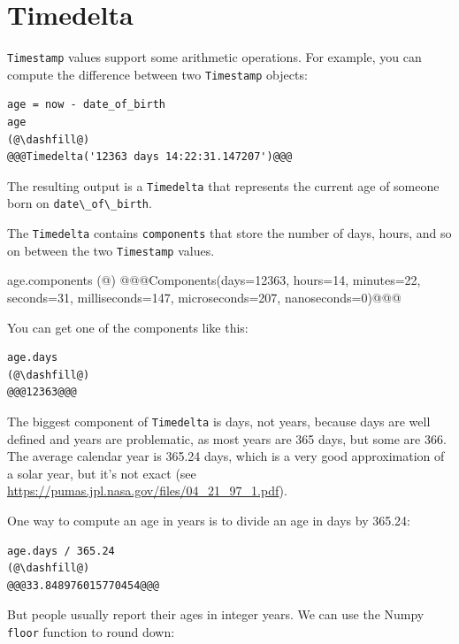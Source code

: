 \hypertarget{timedelta}{%
\section{Timedelta}\label{timedelta}}

\passthrough{\lstinline!Timestamp!} values support some arithmetic
operations. For example, you can compute the difference between two
\passthrough{\lstinline!Timestamp!} objects:

\begin{lstlisting}[]
age = now - date_of_birth
age
(@\dashfill@)
@@@Timedelta('12363 days 14:22:31.147207')@@@
\end{lstlisting}
The resulting output is a \passthrough{\lstinline!Timedelta!} that represents the
current age of someone born on
\passthrough{\lstinline!date\_of\_birth!}. 

The
\passthrough{\lstinline!Timedelta!} contains
\passthrough{\lstinline!components!} that store the number of days,
hours, and so on between the two \passthrough{\lstinline!Timestamp!} values.

\begin{codewide}[]
age.components
(@\dashfill@)
@@@Components(days=12363, hours=14, minutes=22, seconds=31, milliseconds=147, microseconds=207, nanoseconds=0)@@@
\end{codewide}

You can get one of the components like this:

\begin{lstlisting}[]
age.days
(@\dashfill@)
@@@12363@@@
\end{lstlisting}

The biggest component of \passthrough{\lstinline!Timedelta!} is days,
not years, because days are well defined and years are problematic, as most years are 365 days, but some are 366. The average calendar year is
365.24 days, which is a very good approximation of a solar year, but it's not exact (see
\url{https://pumas.jpl.nasa.gov/files/04_21_97_1.pdf}).

One way to compute an age in years is to divide an age in days by 365.24:

\begin{lstlisting}[]
age.days / 365.24
(@\dashfill@)
@@@33.848976015770454@@@
\end{lstlisting}

But people usually report their ages in integer years. We can use the
Numpy \passthrough{\lstinline!floor!} function to round down:

